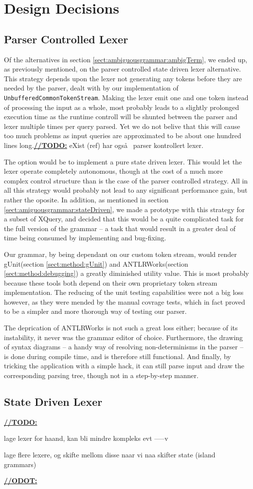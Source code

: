 \section{Design Decisions}
\label{sect:discussion:designDecisions}

\subsection{Parser Controlled Lexer}
Of the alternatives in section \ref{sect:ambiguousgrammar:ambigTerm}, we ended up, as previously mentioned, on the parser controlled state driven lexer alternative. This strategy depends upon the lexer not generating any tokens before they are needed by the parser, dealt with by our implementation of \verb!UnbufferedCommonTokenStream!. Making the lexer emit one and one token instead of processing the input as a whole, most probably leads to a slightly prolonged execution time as the runtime controll will be shunted between the parser and lexer multiple times per query parsed. Yet we do not belive that this will cause too much problems as input queries are approximated to be about one hundred lines long.\underline{\textbf{\LARGE //TODO:}} eXist (ref) har ogs\aa~ parser kontrollert lexer.

The option would be to implement a pure state driven lexer. This would let the lexer operate completely autonomous, though at the cost of a much more complex control structure than is the case of the parser controlled strategy. All in all this strategy would probably not lead to any significant performance gain, but rather the oposite. In addition, as mentioned in section \ref{sect:amiguousgrammar:stateDriven}, we made a prototype with this strategy for a subset of XQuery, and decided that this would be a quite complicated task for the full version of the grammar -- a task that would result in a greater deal of time being consumed by implementing and bug-fixing.

Our grammar, by being dependant on our custom token stream, would render gUnit(section \ref{sect:method:gUnit}) and ANTLRWorks(section \ref{sect:method:debugging}) a greatly diminished utility value. This is most probably because these tools both depend on their own proprietary token stream implementation. The reducing of the unit testing capabilities were not a big loss however, as they were mended by the manual covrage tests, which in fact proved to be a simpler and more thorough way of testing our parser. 

The deprication of ANTLRWorks is not such a great loss either; because of its instability, it never was the grammar editor of choice. Furthermore, the drawing of syntax diagrams -- a handy way of resolving non-determinisms in the parser -- is done during compile time, and is therefore still functional. And finally, by tricking the application with a simple hack, it can still parse input and draw the corresponding parsing tree, though not in a step-by-step manner.

\subsection{State Driven Lexer}

\underline{\textbf{\LARGE //TODO:}}

lage lexer for haand, kan bli mindre kompleks evt -----v

lage flere lexere, og skifte mellom disse naar vi naa skifter state (island grammars)

\underline{\textbf{\LARGE //ODOT:}}